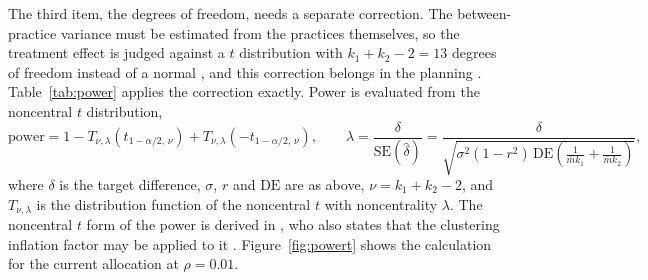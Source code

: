 \documentclass[11pt,a4paper]{article}
\begin{document}
The third item, the degrees of freedom, needs a separate correction. The between-practice variance must be estimated from the
practices themselves, so the treatment effect is judged against a $t$
distribution with $k_1 + k_2 - 2 = 13$ degrees of freedom instead of a
normal \citep[section 10.3.1]{hayes2017}, and this correction belongs in
the planning \citep{leyrat2018}. Table~\ref{tab:power} applies the
correction exactly. Power is evaluated from the noncentral $t$ distribution,
\begin{equation}
\label{eq:power}
\mathrm{power} = 1 - T_{\nu,\lambda}\!\left(t_{1-\alpha/2,\,\nu}\right)
                 + T_{\nu,\lambda}\!\left(-t_{1-\alpha/2,\,\nu}\right),
\qquad
\lambda = \frac{\delta}{\mathrm{SE}(\hat\delta)}
= \frac{\delta}{\sqrt{\sigma^2 (1-r^2)\,\mathrm{DE}
\left(\frac{1}{\bar m k_1}+\frac{1}{\bar m k_2}\right)}},
\end{equation}
where $\delta$ is the target difference, $\sigma$, $r$ and $\mathrm{DE}$
are as above, $\nu = k_1 + k_2 - 2$, and $T_{\nu,\lambda}$ is the
distribution function of the noncentral $t$ with noncentrality $\lambda$.
The noncentral $t$ form of the power is derived in \citet[section
3.2]{julious2023}, who also states that the clustering inflation factor may
be applied to it \citep[section 5.3.2]{julious2023}. Figure~\ref{fig:powert} shows the
calculation for the current allocation at $\rho = 0.01$.
\end{document}
